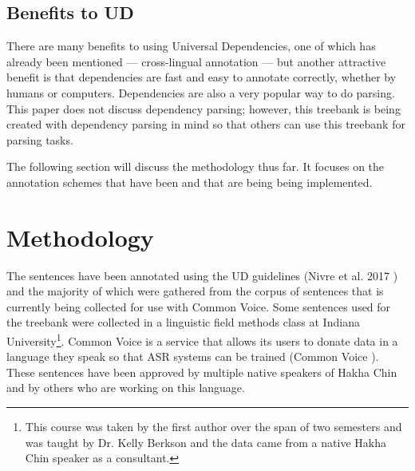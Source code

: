 \documentclass[10pt, a4paper]{article}
\begin{document}
%


\subsection{Benefits to UD}
\label{sec:benefits}

There are many benefits to using Universal Dependencies, one of which has already been mentioned --- cross-lingual annotation --- but another attractive benefit is that dependencies are fast and easy to annotate correctly, whether by humans or computers. Dependencies are also a very popular way to do parsing. This paper does not discuss dependency parsing; however, this treebank is being created with dependency parsing in mind so that others can use this treebank for parsing tasks. 

The following section will discuss the methodology thus far. It focuses on the annotation schemes that have been and that are being being implemented. 

\section{Methodology}
\label{sec:methods}
The sentences have been annotated using the UD guidelines (Nivre et al. 2017 \cite{nivre2017universal}) and the majority of which were gathered from the corpus of sentences that is currently being collected for use with Common Voice. Some sentences used for the treebank were collected in a linguistic field methods class at Indiana University\footnote{This course was taken by the first author over the span of two semesters and was taught by Dr. Kelly Berkson and the data came from a native Hakha Chin speaker as a consultant.}. Common Voice is a service that allows its users to donate data in a language they speak so that ASR systems can be trained (Common Voice \cite{commonvoice}). These sentences have been approved by multiple native speakers of Hakha Chin and by others who are working on this language. 
\end{document}
